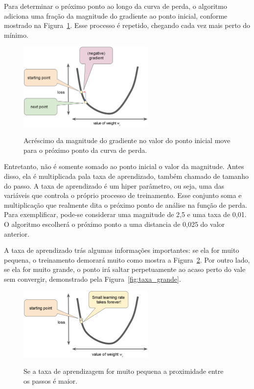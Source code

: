             Para determinar o próximo ponto ao longo da curva de perda, o algoritmo adiciona uma fração da magnitude do gradiente ao ponto inicial, conforme mostrado na Figura~\ref{fig:vetor_magnitude_gradiente}. Esse processo é repetido, chegando cada vez mais perto do mínimo. 
    
            \begin{figure}[H]
                \centering
                \caption{Acréscimo da magnitude do gradiente no valor do ponto inicial move para o próximo ponto da curva de perda.}
                \includegraphics[width=0.6\textwidth]{fig/2-fundamentacao/aprendizado/vetor_magnitude_gradiente.png}
                \label{fig:vetor_magnitude_gradiente}
            \end{figure}
            
            Entretanto, não é somente somado ao ponto inicial o valor da magnitude. Antes disso, ela é multiplicada pala taxa de aprendizado, também chamado de tamanho do passo. A taxa de aprendizado é um hiper parâmetro, ou seja, uma das variáveis que controla o próprio processo de treinamento. Esse conjunto soma e multiplicação que realmente dita o próximo ponto de análise na função de perda. Para exemplificar, pode-se considerar uma magnitude de 2,5 e uma taxa de 0,01. O algoritmo escolherá o próximo ponto a uma distancia de 0,025 do valor anterior.
            
            A taxa de aprendizado trás algumas informações importantes: se ela for muito pequena, o treinamento demorará muito como mostra a Figura~\ref{fig:taxa_pequena}. Por outro lado, se ela for muito grande, o ponto irá saltar perpetuamente ao acaso perto do vale sem convergir, demonstrado pela Figura~\ref{fig:taxa_grande}. 
    
            \begin{figure}[H]
                \centering
                \caption{Se a taxa de aprendizagem for muito pequena a proximidade entre os passos é maior.}
                \includegraphics[width=0.6\textwidth]{fig/2-fundamentacao/aprendizado/taxa_pequena.png}
                \label{fig:taxa_pequena}
            \end{figure}
            
